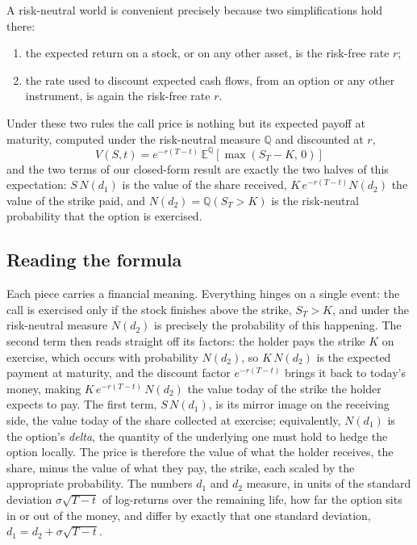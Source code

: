 \documentclass[a4paper,12pt]{article}
\numberwithin{equation}{section}
\begin{document}
A risk-neutral world is convenient precisely because two simplifications hold there:
\begin{enumerate}
  \item the expected return on a stock, or on any other asset, is the risk-free rate $r$;
  \item the rate used to discount expected cash flows, from an option or any other
        instrument, is again the risk-free rate $r$.
\end{enumerate}
Under these two rules the call price is nothing but its expected payoff at maturity,
computed under the risk-neutral measure $\mathbb{Q}$ and discounted at $r$,
\begin{equation}\label{eq:rn-expectation}
  V(S,t) = e^{-r(T-t)}\,\mathbb{E}^{\mathbb{Q}}\!\left[\max(S_T - K,\,0)\right]
\end{equation}
and the two terms of our closed-form result are exactly the two halves of this
expectation: $S\,N(d_1)$ is the value of the share received, $K\,e^{-r(T-t)}N(d_2)$
the value of the strike paid, and $N(d_2) = \mathbb{Q}(S_T > K)$ is the
risk-neutral probability that the option is exercised.

\subsection*{Reading the formula}
Each piece carries a financial meaning. Everything hinges on a single event: the
call is exercised only if the stock finishes above the strike, $S_T > K$, and under
the risk-neutral measure $N(d_2)$ is precisely the probability of this happening.
The second term then reads straight off its factors: the holder pays the strike $K$
on exercise, which occurs with probability $N(d_2)$, so $K\,N(d_2)$ is the expected
payment at maturity, and the discount factor $e^{-r(T-t)}$ brings it back to today's money,
making $K\,e^{-r(T-t)}\,N(d_2)$ the value today of the strike the holder expects to
pay. The first term, $S\,N(d_1)$, is its mirror image on the receiving side, the
value today of the share collected at exercise; equivalently, $N(d_1)$ is the
option's \emph{delta}, the quantity of the underlying one must hold to hedge the
option locally. The price is therefore the value of what the holder receives, the
share, minus the value of what they pay, the strike, each scaled by the appropriate
probability. The numbers $d_1$ and $d_2$ measure, in units of the standard
deviation $\sigma\sqrt{T-t}$ of log-returns over the remaining life, how far the
option sits in or out of the money, and differ by exactly that one standard
deviation, $d_1 = d_2 + \sigma\sqrt{T-t}$.
\end{document}
